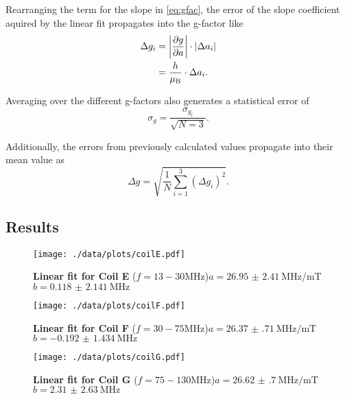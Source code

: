 Rearranging the term for the slope in \autoref{eq:gfac}, the error of the slope coefficient aquired by the linear fit propagates into the g-factor like
\begin{alignat*}{2}
	\Delta g_i &= \abs{\frac{\partial g}{\partial a}}\cdot \abs{\Delta a_i} \\
	&= \frac{h}{\mu_\text{B}}\cdot\Delta a_i.
\end{alignat*}

Averaging over the different g-factors also generates a statistical error of
\begin{equation*}
	\sigma_g = \frac{\sigma_{g_i}}{\sqrt{N=3}}.
\end{equation*}

Additionally, the errors from previously calculated values propagate into their mean value as
\begin{equation*}
	\Delta g = \sqrt{\frac{1}{N}\sum_{i=1}^3 \left(\Delta g_i\right)^2}.
\end{equation*}

\subsection{Results}
\begin{figure}
	\centering
	\texttt{[image: ./data/plots/coilE.pdf]}
	\caption{\textbf{Linear fit for Coil E} ($f=13-30\si{\MHz}$)\newline $a=\SI{26.95(241)}{\MHz\per\milli\tesla}$\newline $b=\SI{0.118(2141)}{\MHz}$}\label{fig:coilE}
\end{figure}
\begin{figure}
	\centering
	\texttt{[image: ./data/plots/coilF.pdf]}
	\caption{\textbf{Linear fit for Coil F} ($f=30-75\si{\MHz}$)\newline $a=\SI{26.37(71)}{\MHz\per\milli\tesla}$\newline $b=\SI{-0.192(1434)}{\MHz}$}\label{fig:coilF}
\end{figure}
\begin{figure}
	\centering
	\texttt{[image: ./data/plots/coilG.pdf]}
	\caption{\textbf{Linear fit for Coil G} ($f=75-130\si{\MHz}$)\newline $a=\SI{26.62(70)}{\MHz\per\milli\tesla}$\newline $b=\SI{2.31(263)}{\MHz}$}\label{fig:coilG}
\end{figure}

